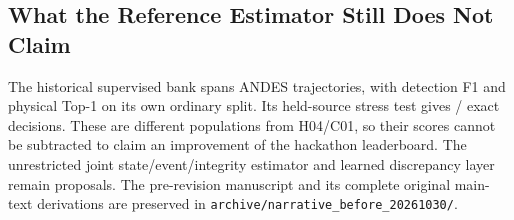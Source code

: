 \subsection{What the Reference Estimator Still Does Not Claim}
The historical supervised bank spans \LegacyEventTrajectories{} ANDES trajectories, with detection F1 \LegacyEventDetectionFOne{} and physical Top-1 \LegacyPhysicalTopOne{} on its own ordinary split. Its held-source stress test gives \HeldSourceCorrect{}/\HeldSourceDecisions{} exact decisions. These are different populations from H04/C01, so their scores cannot be subtracted to claim an improvement of the hackathon leaderboard. The unrestricted joint state/event/integrity estimator and learned discrepancy layer remain proposals. The pre-revision manuscript and its complete original main-text derivations are preserved in \texttt{archive/narrative\_before\_20261030/}.
\FloatBarrier
